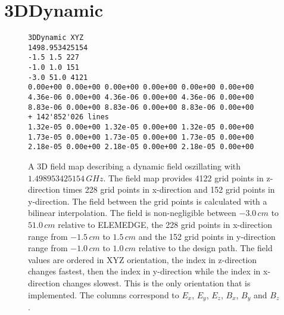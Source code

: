 \section{3DDynamic}
\label{sec:3DDynamic}
\begin{figure}[h]
\label{fig:3DDynamic}
\begin{fmpage}
\begin{verbatim}
3DDynamic XYZ
1498.953425154
-1.5 1.5 227
-1.0 1.0 151
-3.0 51.0 4121
0.00e+00 0.00e+00 0.00e+00 0.00e+00 0.00e+00 0.00e+00
4.36e-06 0.00e+00 4.36e-06 0.00e+00 4.36e-06 0.00e+00
8.83e-06 0.00e+00 8.83e-06 0.00e+00 8.83e-06 0.00e+00
+ 142'852'026 lines
1.32e-05 0.00e+00 1.32e-05 0.00e+00 1.32e-05 0.00e+00
1.73e-05 0.00e+00 1.73e-05 0.00e+00 1.73e-05 0.00e+00
2.18e-05 0.00e+00 2.18e-05 0.00e+00 2.18e-05 0.00e+00
\end{verbatim}
\end{fmpage}
\caption[Example of a 3DDynamic field map]{A 3D field map describing a dynamic field oszillating with $1.498953425154\,GHz$. The field map provides 4122 grid points in z-direction times 228 grid points in x-direction and 152 grid points in y-direction. The field between the grid points is calculated with a bilinear interpolation. The field is non-negligible between $-3.0\,cm$ to $51.0\,cm$ relative to ELEMEDGE, the 228 grid points in x-direction range from $-1.5\,cm$ to $1.5\,cm$ and the 152 grid points in y-direction range from $-1.0\,cm$ to $1.0\,cm$ relative to the design path. The field values are ordered in XYZ orientation, the index in z-direction changes fastest, then the index in y-direction while the index in x-direction changes slowest. This is the only orientation that is implemented. The columns correspond to $E_x$, $E_y$, $E_z$, $B_x$, $B_y$ and $B_z$.}
\end{figure}
\clearpage

